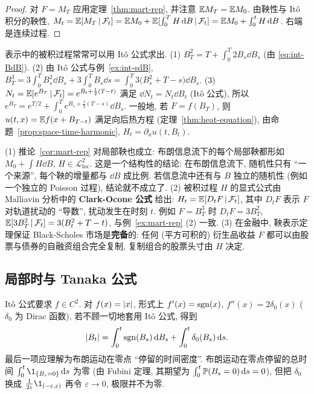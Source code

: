 \begin{proof}
对 $F=M_T$ 应用定理~\ref{thm:mart-rep}, 并注意 $\mathbb{E} M_T=\mathbb{E} M_0$. 由鞅性与 It\^o 积分的鞅性, $M_t=\mathbb{E}[M_T\,|\,\mathcal{F}_t]=\mathbb{E} M_0+\mathbb{E}[\int_0^TH\mathop{}\!\mathrm{d} B\,|\,\mathcal{F}_t]=\mathbb{E} M_0+\int_0^tH\mathop{}\!\mathrm{d} B$. 右端是连续过程.
\end{proof}

\begin{example}\label{ex:mart-rep}
表示中的被积过程常常可以用 It\^o 公式求出.
(1) $B_T^2=T+\int_0^T2B_s\dd B_s$ (由 \eqref{eq:int-BdB}).
(2) 由 It\^o 公式与例~\ref{ex:int-sdB}, $B_T^3=3\int_0^TB_s^2\dd B_s+3\int_0^TB_s\dd s=\int_0^T3\big(B_s^2+T-s\big)\dd B_s$.
(3) $N_t=\mathbb{E}[e^{B_T}\,|\,\mathcal{F}_t]=e^{B_t+\frac{1}{2}(T-t)}$ 满足 $\dd N_t=N_t\dd B_t$ (It\^o 公式), 所以 $e^{B_T}=e^{T/2}+\int_0^Te^{B_s+\frac{1}{2}(T-s)}\dd B_s$.
一般地, 若 $F=f(B_T)$, 则 $u(t,x)=\mathbb{E} f(x+B_{T-t})$ 满足向后热方程 (定理~\ref{thm:heat-equation}), 由命题~\ref{prop:space-time-harmonic}, $H_t=\partial_xu(t,B_t)$.
\end{example}

\begin{remark}
(1) 推论~\ref{cor:mart-rep} 对局部鞅也成立: 布朗信息流下的每个局部鞅都形如 $M_0+\int H\dd B$, $H\in\mathscr{L}^2_{\mathrm{loc}}$. 这是一个结构性的结论: 在布朗信息流下, 随机性只有 ``一个来源'', 每个鞅的增量都与 $\dd B$ 成比例. 若信息流中还有与 $B$ 独立的随机性 (例如一个独立的 Poisson 过程), 结论就不成立了.
(2) 被积过程 $H$ 的显式公式由 Malliavin 分析中的 \textbf{Clark-Ocone 公式} 给出: $H_t=\mathbb{E}[D_tF\,|\,\mathcal{F}_t]$, 其中 $D_tF$ 表示 $F$ 对轨道扰动的 ``导数'', 扰动发生在时刻 $t$. 例如 $F=B_T^3$ 时 $D_tF=3B_T^2$, $\mathbb{E}[3B_T^2\,|\,\mathcal{F}_t]=3(B_t^2+T-t)$, 与例~\ref{ex:mart-rep} (2) 一致.
(3) 在金融中, 鞅表示定理保证 Black-Scholes 市场是\textbf{完备}的: 任何 (平方可积的) 衍生品收益 $F$ 都可以由股票与债券的自融资组合完全复制, 复制组合的股票头寸由 $H$ 决定.
\end{remark}

\subsection{局部时与 Tanaka 公式}

It\^o 公式要求 $f\in C^2$. 对 $f(x)=\lvert x\rvert$, 形式上 $f'(x)=\operatorname{sgn}(x)$, $f''(x)=2\delta_0(x)$ ($\delta_0$ 为 Dirac 函数), 若不顾一切地套用 It\^o 公式, 得到
\[
\lvert B_t\rvert=\int_0^t\operatorname{sgn}(B_s)\mathop{}\!\mathrm{d} B_s+\int_0^t\delta_0(B_s)\mathop{}\!\mathrm{d} s.
\]
最后一项应理解为布朗运动在零点 ``停留的时间密度''. 布朗运动在零点停留的总时间 $\int_0^t\1_{\{B_s=0\}}\dd s$ 为零 (由 Fubini 定理, 其期望为 $\int_0^t\mathbb{P}(B_s=0)\mathop{}\!\mathrm{d} s=0$), 但把 $\delta_0$ 换成 $\frac{1}{2\varepsilon}\1_{(-\varepsilon,\varepsilon)}$ 再令 $\varepsilon\to0$, 极限并不为零.

